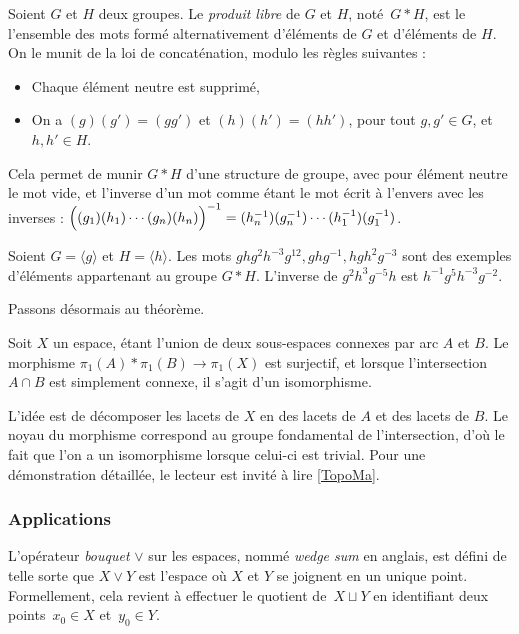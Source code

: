 \begin{definition}
Soient $G$ et $H$ deux groupes. Le \emph{produit libre} de $G$ et $H$, noté~$G\ast H$, est le l'ensemble des mots formé alternativement d'éléments de $G$ et d'éléments de $H$. On le munit de la loi de concaténation, modulo les règles suivantes : \begin{itemize}
    \item Chaque élément neutre est supprimé,
    \item On a $(g)(g')=(gg')$ et $(h)(h')=(hh')$, pour tout $g,g'\in G$, et $h,h'\in H$.
\end{itemize}
Cela permet de munir $G\ast H$ d'une structure de groupe, avec pour élément neutre le mot vide, et l'inverse d'un mot comme étant le mot écrit à l'envers avec les inverses : $\Big((g_1)(h_1)\cdots(g_n)(h_n)\Big)^{-1}=(h_n^{-1})(g_n^{-1})\cdots(h_1^{-1})(g_1^{-1})$.
\end{definition}

\begin{exemple}
Soient $G=\langle g\rangle$ et $H=\langle h\rangle$. Les mots $ghg^2h^{-3}g^{12}, ghg^{-1}, hgh^2g^{-3}$ sont des exemples d'éléments appartenant au groupe $G\ast H$. L'inverse de $g^2h^3g^{-5}h$ est $h^{-1}g^5h^{-3}g^{-2}$.
\end{exemple}

Passons désormais au théorème.

\begin{theorem}\label{th:van-kampen}
Soit $X$ un espace, étant l'union de deux sous-espaces connexes par arc $A$ et $B$. Le morphisme $\pi_1(A)\ast\pi_1(B)\to\pi_1(X)$ est surjectif, et lorsque l'intersection $A\cap B$ est simplement connexe, il s'agit d'un isomorphisme.
\end{theorem}

L'idée est de décomposer les lacets de $X$ en des lacets de $A$ et des lacets de $B$. Le noyau du morphisme correspond au groupe fondamental de l'intersection, d'où le fait que l'on a un isomorphisme lorsque celui-ci est trivial. Pour une démonstration détaillée, le lecteur est invité à lire \href{https://www.normalesup.org/~fjacobe/Topo.pdf}{[TopoMa]}.

\subsubsection{Applications}
L'opérateur \emph{bouquet} $\vee$ sur les espaces, nommé \emph{wedge sum} en anglais, est défini de telle sorte que $X\vee Y$ est l'espace où $X$ et $Y$ se joignent en un unique point. Formellement, cela revient à effectuer le quotient de~$X\sqcup Y$ en identifiant deux points~$x_0\in X$ et~$y_0\in Y$.

